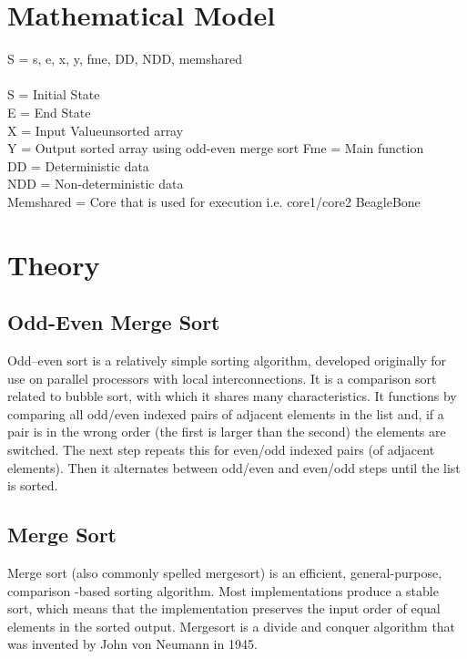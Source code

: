 \documentclass[a4paper,12pt]{article}
\begin{document}
\section{Mathematical Model} 
	S 	= {s, e, x, y, fme, DD, NDD, memshared}  											\\\\
	S                      =         Initial State  										\\
	E 	=          End State  																\\
	X	=           Input Value{unsorted array} 											\\
	Y	=          Output {sorted array using odd-even merge sort} Fme 	= 	Main function 	\\
	DD 	= 	Deterministic data 																\\
	NDD	= 	Non-deterministic data 															\\
	Memshared        =  	Core that is used for execution i.e. core1/core2 BeagleBone 	\\
	
	
\section{Theory}
	\subsection{Odd-Even Merge Sort} 
	Odd–even sort is a relatively simple sorting algorithm, developed originally for use on parallel processors with local interconnections. It is a comparison sort related to bubble sort, with which it shares many characteristics. It functions by comparing all odd/even indexed pairs of adjacent elements in the list and, if a pair is in the wrong order (the first is larger than the second) the elements are switched. The next step repeats this for even/odd indexed pairs (of adjacent elements). Then it alternates between odd/even and even/odd steps until the list is sorted.
	
	\subsection{Merge Sort}
	Merge sort (also commonly spelled mergesort) is an efficient, general-purpose, comparison -based sorting algorithm. Most implementations produce a stable sort, which means that the implementation preserves the input order of equal elements in the sorted output. Mergesort is a divide and conquer algorithm that was invented by John von Neumann in 1945.  
	
\end{document}
